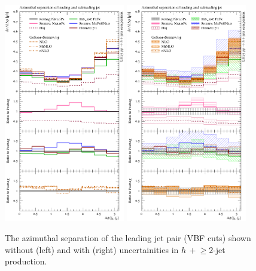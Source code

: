 \begin{figure}[t!]
  \centering
  \includegraphics[width=0.47\textwidth]{figures/hjetscomp_u_deltaphi_jj_VBF.pdf}
  \hfill
  \includegraphics[width=0.47\textwidth]{figures/hjetscomp_deltaphi_jj_VBF.pdf}
  \caption{\label{fig:hjetscomp:results:VBFobs:dphijj}%
    The azimuthal separation of the leading jet pair (VBF cuts) shown
    without (left) and with (right) uncertainities in $h\,+\!\ge\!\!2$-jet
    production.}
\end{figure}

